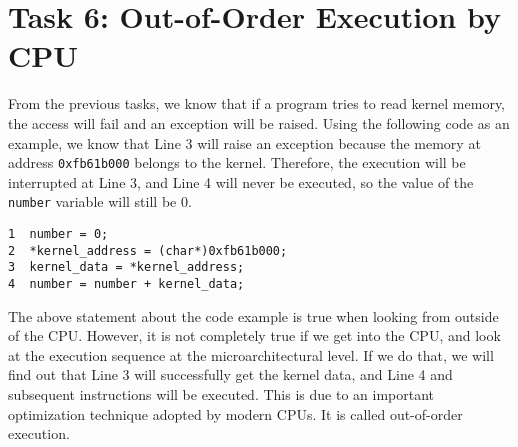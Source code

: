

%
%
%
%







\section{Task 6: Out-of-Order Execution by CPU}


From the previous tasks, we know that if a program tries to read 
kernel memory, the access will fail and an exception will be raised. 
Using the following code as an example, we know that 
Line 3 will raise an exception because the memory at address \texttt{0xfb61b000}
belongs to the kernel. Therefore, the execution will be interrupted at Line 3, and 
Line 4 will never be executed, so the value of 
the \texttt{number} variable will still be 0.

\begin{lstlisting}
1  number = 0;
2  *kernel_address = (char*)0xfb61b000;
3  kernel_data = *kernel_address;
4  number = number + kernel_data;
\end{lstlisting}

The above statement about the code example is true when looking from outside of the CPU. 
However, it is not completely true if we get into the CPU, and look at the execution sequence
at the microarchitectural level. If we do that, we will find out that 
Line 3 will successfully get the kernel data, and Line 4 and subsequent instructions 
will be executed. This is due to an important optimization technique adopted by
modern CPUs. It is called out-of-order execution. 


